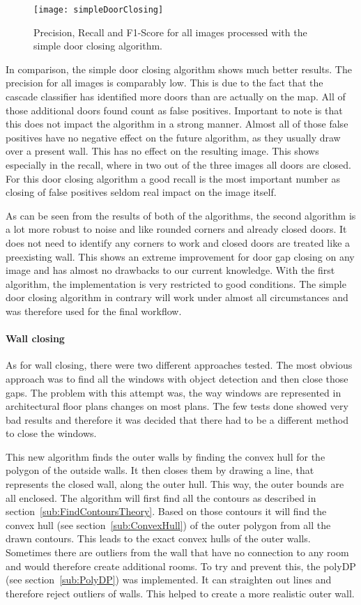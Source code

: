 \begin{figure}[H]
	\centering
	\texttt{[image: simpleDoorClosing]}
	\caption{Precision, Recall and F1-Score for all images processed with the simple door closing algorithm. }
	\label{fig:simpleDoorClosing}
\end{figure}

In comparison, the simple door closing algorithm shows much better results. The precision for all images is comparably low. This is due to the fact that the cascade classifier has identified more doors than are actually on the map. All of those additional doors found count as false positives. Important to note is that this does not impact the algorithm in a strong manner. Almost all of those false positives have no negative effect on the future algorithm, as they usually draw over a present wall. This has no effect on the resulting image. This shows especially in the recall, where in two out of the three images all doors are closed.
For this door closing algorithm a good recall is the most important number as closing of false positives seldom real impact on the image itself.

As can be seen from the results of both of the algorithms, the second algorithm is a lot more robust to noise and like rounded corners and already closed doors. It does not need to identify any corners to work and closed doors are treated like a preexisting wall. This shows an extreme improvement for door gap closing on any image and has almost no drawbacks to our current knowledge. With the first algorithm, the implementation is very restricted to good conditions. The simple door closing algorithm in contrary will work under almost all circumstances and was therefore used for the final workflow.

\paragraph{Wall closing}
\label{sub:WallClosing}
As for wall closing, there were two different approaches tested. The most obvious approach was to find all the windows with object detection and then close those gaps. The problem with this attempt was, the way windows are represented in architectural floor plans changes on most plans. The few tests done showed very bad results and therefore it was decided that there had to be a different method to close the windows.

This new algorithm finds the outer walls by finding the convex hull for the polygon of the outside walls. It then closes them by drawing a line, that represents the closed wall, along the outer hull. This way, the outer bounds are all enclosed.
The algorithm will first find all the contours as described in section~\ref{sub:FindContoursTheory}. Based on those contours it will find the convex hull (see section~\ref{sub:ConvexHull}) of the outer polygon from all the drawn contours. This leads to the exact convex hulls of the outer walls. Sometimes there are outliers from the wall that have no connection to any room and would therefore create additional rooms. To try and prevent this, the polyDP (see section~\ref{sub:PolyDP}) was implemented. It can straighten out lines and therefore reject outliers of walls. This helped to create a more realistic outer wall.
